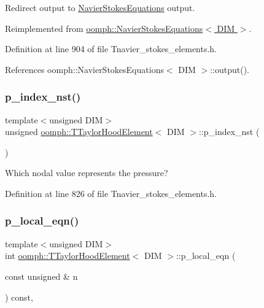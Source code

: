 Redirect output to \hyperlink{classoomph_1_1NavierStokesEquations}{Navier\+Stokes\+Equations} output. 



Reimplemented from \hyperlink{classoomph_1_1NavierStokesEquations_af09ce1e73bca9a9ac93cb2e34de24f6b}{oomph\+::\+Navier\+Stokes\+Equations$<$ D\+I\+M $>$}.



Definition at line 904 of file Tnavier\+\_\+stokes\+\_\+elements.\+h.



References oomph\+::\+Navier\+Stokes\+Equations$<$ D\+I\+M $>$\+::output().

\mbox{\label{classoomph_1_1TTaylorHoodElement_a051ebd14ec8a7327e6dd76986eb007a0}} 
\subsubsection{\texorpdfstring{p\+\_\+index\+\_\+nst()}{p\_index\_nst()}}
{\footnotesize\ttfamily template$<$unsigned D\+IM$>$ \\
unsigned \hyperlink{classoomph_1_1TTaylorHoodElement}{oomph\+::\+T\+Taylor\+Hood\+Element}$<$ D\+IM $>$\+::p\+\_\+index\+\_\+nst (\begin{DoxyParamCaption}{ }\end{DoxyParamCaption})\hspace{0.3cm}{\ttfamily [inline]}}



Which nodal value represents the pressure? 



Definition at line 826 of file Tnavier\+\_\+stokes\+\_\+elements.\+h.

\mbox{\label{classoomph_1_1TTaylorHoodElement_adb29767b15234d632c11991a4f9a3911}} 
\subsubsection{\texorpdfstring{p\+\_\+local\+\_\+eqn()}{p\_local\_eqn()}}
{\footnotesize\ttfamily template$<$unsigned D\+IM$>$ \\
int \hyperlink{classoomph_1_1TTaylorHoodElement}{oomph\+::\+T\+Taylor\+Hood\+Element}$<$ D\+IM $>$\+::p\+\_\+local\+\_\+eqn (\begin{DoxyParamCaption}\item[{const unsigned \&}]{n }\end{DoxyParamCaption}) const\hspace{0.3cm}{\ttfamily [inline]}, {\ttfamily [virtual]}}



